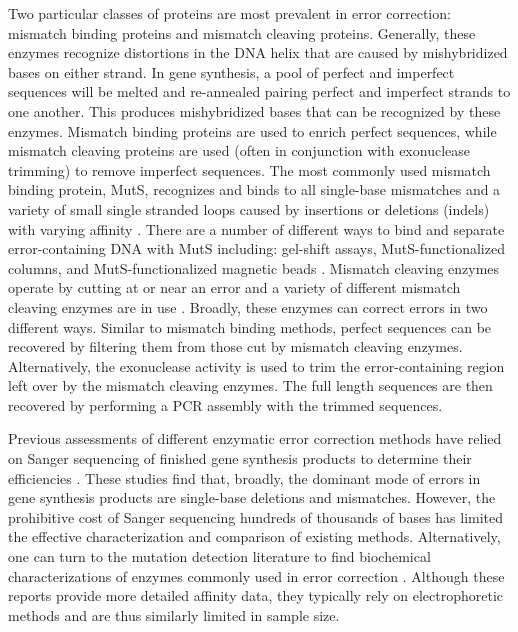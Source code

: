 \documentclass[twocolumn]{article}
\begin{document}
Two particular classes of proteins are most prevalent in error correction: mismatch binding proteins and mismatch cleaving proteins. Generally, these enzymes recognize distortions in the DNA helix that are caused by mishybridized bases on either strand. In gene synthesis, a pool of perfect and imperfect sequences will be melted and re-annealed pairing perfect and imperfect strands to one another. This produces mishybridized bases that can be recognized by these enzymes. Mismatch binding proteins are used to enrich perfect sequences, while mismatch cleaving proteins are used (often in conjunction with exonuclease trimming) to remove imperfect sequences. The most commonly used mismatch binding protein, MutS, recognizes and binds to all single-base mismatches and a variety of small single stranded loops caused by insertions or deletions (indels) with varying affinity \cite{smith1997,whitehouse1997,brown2001,cho2007,groothuizen2013}. There are a number of different ways to bind and separate error-containing DNA with MutS including: gel-shift assays, MutS-functionalized columns, and MutS-functionalized magnetic beads \cite{carr2004,wan2014,geschwind1996}. Mismatch cleaving enzymes operate by cutting at or near an error and a variety of different mismatch cleaving enzymes are in use \cite{ma2012}. Broadly, these enzymes  can correct errors in two different ways. Similar to mismatch binding methods, perfect sequences can be recovered by filtering them from those cut by mismatch cleaving enzymes. Alternatively, the exonuclease activity is used to trim the error-containing region left over by the mismatch cleaving enzymes. The full length sequences are then recovered by performing a PCR assembly with the trimmed sequences.

Previous assessments of different enzymatic error correction methods have relied on Sanger sequencing of finished gene synthesis products to determine their efficiencies \cite{carr2004,fuhrmann2005,sequeira2016,saaem2012,wan2014}. These studies find that, broadly, the dominant mode of errors in gene synthesis products are single-base deletions and mismatches. However, the prohibitive cost of Sanger sequencing hundreds of thousands of bases has limited the effective characterization and comparison of existing methods. Alternatively, one can turn to the mutation detection literature to find biochemical characterizations of enzymes commonly used in error correction \cite{qiu2004mutation,cho2007,tsuji2008,huang2012,vouillot2015}. Although these reports provide more detailed affinity data, they typically rely on electrophoretic methods and are thus similarly limited in sample size.
\end{document}
